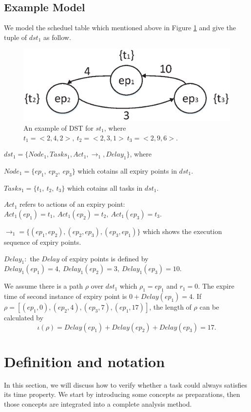 \documentclass[sigconf]{acmart}
\begin{document}
\subsection{Example Model}\label{section_dst_1}
We model the scheduel table which mentioned above in Figure \ref{figure_dst1} and give the tuple of $dst_1$ as follow.
\begin{figure}
  \centering
  \includegraphics[scale=.45]{graphics/figure_dst1.eps}
  \caption{An example of DST for $st_1$, where $t_1=<2,4,2>,\ t_2=<2,3,1>\ t_3=<2,9,6>$.}
  \label{figure_dst1}
\end{figure}

$dst_1=\{Node_1,Tasks_1,Act_1,\rightarrow_1,Delay_1\}$, where 
\begin{compactitem}
\item $Node_1=\{ep_1,\ ep_2,\ ep_3\}$ which cotains all expiry points in $dst_1$.
\item $Tasks_1=\{t_1,\ t_2,\ t_3\}$ which cotains all tasks in $dst_1$.
\item $Act_1$ refers to actions of an expiry point:$Act_1(ep_1)=t_1,\ Act_1(ep_2)=t_2,\ Act_1(ep_3)=t_3$.
\item $\rightarrow_1=\{(ep_1,ep_2),(ep_2,ep_3),(ep_3,ep_1)\}$ which shows the execution sequence of expiry points.
\item $Delay_1:$ the $Delay$ of expiry points is defined by $Delay_1(ep_1)=4,\ Delay_1(ep_2)=3,\ Delay_1(ep_3)=10$.
\end{compactitem}

We assume there is a path $\rho$ over $dst_1$ which $\rho_1=ep_1$ and $r_1=0$. The expire time of second instance of expiry point is $0+Delay(ep_1)=4$. If $\rho=[(ep_1,0),(ep_2,4),(ep_3,7),(ep_1,17)]$, the length of $\rho$ can be calculated by
\[\iota(\rho)=Delay(ep_1)+Delay(ep_2)+Delay(ep_3)=17.\]

\section{Definition and notation}\label{concept}
In this section, we will discuss how to verify whether a task could always satisfies its time property. We start by introducing some concepts as preparations, then those concepts are integrated into a complete analysis method.
\end{document}
